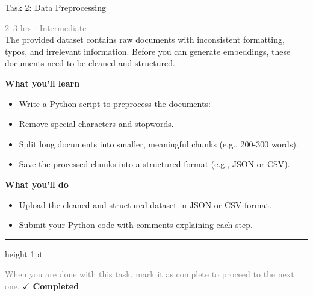 \documentclass[10pt,a4paper]{article}
\begin{document}
\begin{taskbox}{Task 2: Data Preprocessing}

    {\small \textcolor{gray}{2--3 hrs $\cdot$ Intermediate}}\\[12pt]

     The provided dataset contains raw documents with inconsistent formatting, typos, and irrelevant information. Before you can generate embeddings, these documents need to be cleaned and structured.  


\vspace{8pt}
{\large \textbf{\textcolor{brandLight}{What you'll learn}}}\\[4pt]  
\begin{itemize}
    \item Write a Python script to preprocess the documents:  
    \item Remove special characters and stopwords.  
    \item Split long documents into smaller, meaningful chunks (e.g., 200-300 words).  
    \item Save the processed chunks into a structured format (e.g., JSON or CSV).  
\end{itemize}

\vspace{8pt}
{\large \textbf{\textcolor{brandLight}{What you'll do}}}\\[4pt]  
\begin{itemize}
    \item Upload the cleaned and structured dataset in JSON or CSV format.  
    \item Submit your Python code with comments explaining each step.\par
\end{itemize}

    \vspace{16pt}

    \textcolor{cardBorder}{\hrule height 1pt}\vspace{8pt}

    \small \textcolor{gray}{When you are done with this task, mark it as complete to proceed to the next one.} \hfill \textbf{\textcolor{brandDark}{$\checkmark$ Completed}}

\end{taskbox}
\end{document}
